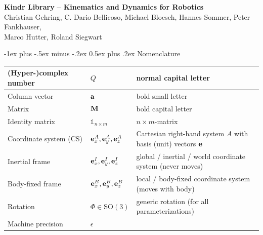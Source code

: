 \documentclass[10pt,landscape,a4paper]{article}
\makeatletter
\renewcommand{\section}{\@startsection{section}{1}{0mm}%
                               {-1ex plus -.5ex minus -.2ex}%
                                {0.5ex plus .2ex}%
                                {\normalfont\large\bfseries}}
\newcommand\identity{\mathds{1}}
\makeatother
\begin{document}
\raggedright
\footnotesize
\begin{multicols}{2}

\setlength{\premulticols}{1pt}
\setlength{\postmulticols}{1pt}
\setlength{\multicolsep}{1pt}
\setlength{\columnsep}{2pt}

\begin{center}
     \Large{\textbf{Kindr Library}} \small{\textbf{-- Kinematics and Dynamics for Robotics}}\\
        \vspace{2mm}\scriptsize{Christian Gehring, C. Dario Bellicoso, Michael Bloesch, Hannes Sommer, Peter Fankhauser, \\ Marco Hutter, Roland Siegwart} \\ 
\end{center}
\section{Nomenclature}
\begin{tabular}{ll@{   }l}
\hline
(Hyper-)complex number & $Q$ & normal capital letter  \\ \hline
Column vector & $\mathbf a$ & bold small letter  \\ \hline
Matrix & $\mathbf M$ & bold capital letter  \\ \hline
Identity matrix & $\identity_{n\times m}$ & ${n \times m}$-matrix  \\  \hline
Coordinate system (CS) & ${\mathbf e_x^A,\mathbf e_y^A,\mathbf e_z^A}$ & Cartesian right-hand system $A$ with basis (unit) vectors $\mathbf e$  \\ \hline
Inertial frame & ${\mathbf e_x^I,\mathbf e_y^I,\mathbf e_z^I}$ & global / inertial / world coordinate system (never moves) \\ \hline
Body-fixed frame & ${\mathbf e_x^B,\mathbf e_y^B,\mathbf e_z^B}$ & local / body-fixed coordinate system (moves with body) \\ \hline
Rotation & $\Phi \in \mathrm{SO}(3)$ & generic rotation (for all parameterizations) \\ \hline
Machine precision & $\epsilon$ & \\ \hline


\end{tabular}
\end{multicols}
\end{document}
